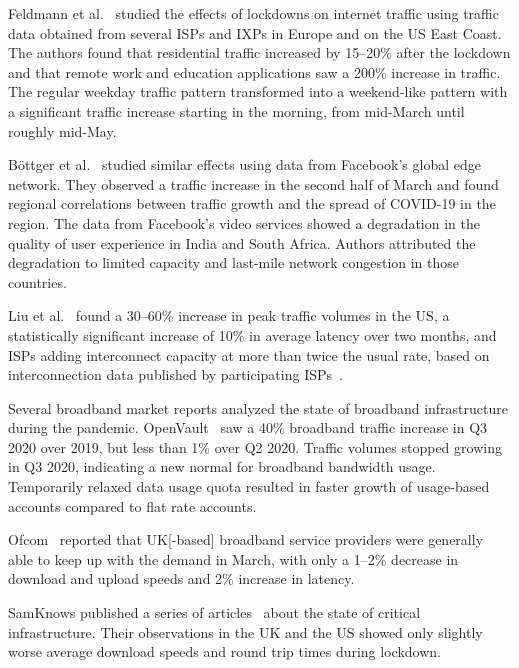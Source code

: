 \documentclass[conference,10pt]{IEEEtran}
\begin{document}
Feldmann et al.~\cite{feldmann2020lockdown} studied the effects of lockdowns on internet traffic using traffic data obtained from several \glspl{ISP} and \glspl{IXP} in Europe and on the \gls{US} East Coast. The authors found that residential traffic increased by 15--20\% after the lockdown and that remote work and education applications saw a 200\% increase in traffic. The regular weekday traffic pattern transformed into a weekend-like pattern with a significant traffic increase starting in the morning, from mid-March until roughly mid-May.

B\"{o}ttger et al.~\cite{bottger2020internet} studied similar effects using data from Facebook's global edge network. They observed a traffic increase in the second half of March and found regional correlations between traffic growth and the spread of COVID-19 in the region. The data from Facebook's video services showed a degradation in the quality of user experience in India and South Africa. Authors attributed the degradation to limited capacity and last-mile network congestion in those countries.

Liu et al.~\cite{liu2020characterizing} found a 30--60\% increase in peak traffic volumes in the \gls{US}, a statistically significant increase of 10\% in average latency over two months, and \glspl{ISP} adding interconnect capacity at more than twice the usual rate, based on interconnection data published by participating \glspl{ISP}~\cite{feamster2016revealing}.

Several broadband market reports analyzed the state of broadband infrastructure during the pandemic. OpenVault~\cite{openvault} saw a 40\% broadband traffic increase in Q3 2020 over 2019, but less than 1\% over Q2 2020. Traffic volumes stopped growing in Q3 2020, indicating a new normal for broadband bandwidth usage. Temporarily relaxed data usage quota resulted in faster growth of usage-based accounts compared to flat rate accounts.

Ofcom~\cite{uk-home-broadband-performance} reported that \gls{UK}[-based] broadband service providers were generally able to keep up with the demand in March, with only a 1--2\% decrease in download and upload speeds and 2\% increase in latency.

SamKnows published a series of articles~\cite{samknows-cdn,samknows-video-streaming,samknows-video-conferencing,samknows-usa} about the state of critical infrastructure. Their observations in the \gls{UK} and the \gls{US} showed only slightly worse average download speeds and round trip times during lockdown.
\end{document}
